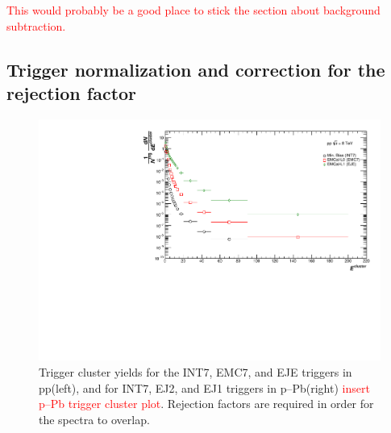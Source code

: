 \documentclass[ALICE]{ALICE_analysis_notes}
\newcommand{\pPb}{{\mbox{p--Pb}}\xspace}
\newcommand{\pp}{pp\xspace}
\begin{document}
\textcolor{red}{This would probably be a good place to stick the section about background subtraction.}

\subsection{Trigger normalization and correction for the rejection factor}
\label{sec:triggerCorrection}

\begin{figure}
    \centering
    \includegraphics[width=15cm]{figures/TriggerClusters/clusters_R02.pdf}
    \caption{Trigger cluster yields for the INT7, EMC7, and EJE triggers in \pp (left), and for INT7, EJ2, and EJ1 triggers in \pPb (right) \textcolor{red}{insert \pPb trigger cluster plot}. Rejection factors are required in order for the spectra to overlap.}
    \label{fig:triggerClusters}
\end{figure}
\end{document}
